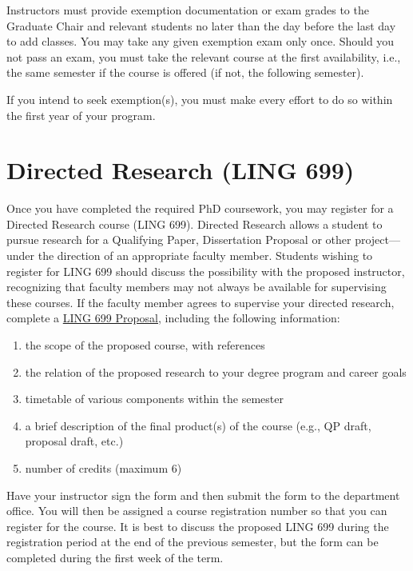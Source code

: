\documentclass[
]{book}
\providecommand{\tightlist}{%
  \setlength{\itemsep}{0pt}\setlength{\parskip}{0pt}}
\begin{document}
Instructors must provide exemption documentation or exam grades to the Graduate Chair and relevant students no later than the day before the last day to add classes. You may take any given exemption exam only once. Should you not pass an exam, you must take the relevant course at the first availability, i.e., the same semester if the course is offered (if not, the following semester).

If you intend to seek exemption(s), you must make every effort to do so within the first year of your program.

\hypertarget{directed-research-ling-699}{%
\section{Directed Research (LING 699)}\label{directed-research-ling-699}}

Once you have completed the required PhD coursework, you may register for a Directed Research course (LING 699). Directed Research allows a student to pursue research for a Qualifying Paper, Dissertation Proposal or other project---under the direction of an appropriate faculty member. Students wishing to register for LING 699 should discuss the possibility with the proposed instructor, recognizing that faculty members may not always be available for supervising these courses. If the faculty member agrees to supervise your directed research, complete a \href{docs/699form.pdf}{LING 699 Proposal}, including the following information:

\begin{enumerate}
\def\labelenumi{\arabic{enumi}.}
\tightlist
\item
  the scope of the proposed course, with references
\item
  the relation of the proposed research to your degree program and career goals
\item
  timetable of various components within the semester
\item
  a brief description of the final product(s) of the course (e.g., QP draft, proposal draft, etc.)
\item
  number of credits (maximum 6)
\end{enumerate}

Have your instructor sign the form and then submit the form to the department office. You will then be assigned a course registration number so that you can register for the course. It is best to discuss the proposed LING 699 during the registration period at the end of the previous semester, but the form can be completed during the first week of the term.
\end{document}
